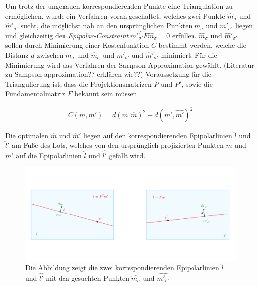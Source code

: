 Um trotz der ungenauen korrespondierenden Punkte eine Triangulation zu ermöglichen, wurde ein Verfahren voran geschaltet, welches zwei Punkte $\hat{m}_\sigma$ und $\hat{m}'_{\sigma'}$ sucht, die möglichst nah an den ursprünglichen Punkten $m_\sigma$ und $m'_{\sigma'}$ liegen und gleichzeitig den \textit{Epipolar-Constraint} $\hat{m}'^T_{\sigma'}F\hat{m}_\sigma = 0$ erfüllen. $\hat{m}_\sigma$ und $\hat{m}'_{\sigma'}$ sollen durch Minimierung einer Kostenfunktion $C$ bestimmt werden, welche die Distanz  $d$ zwischen $m_\sigma$ und $\hat{m}_\sigma$ und $m'_{\sigma'}$ und $\hat{m}'_{\sigma'}$ minimiert. Für die Minimierung wird das Verfahren der Sampson-Approximation gewählt\cite{HZ}. (Literatur zu Sampson approximation?? erklären wie??) Voraussetzung für die Triangulierung ist, dass die Projektionsmatrizen $P$ und $P'$, sowie die Fundamentalmatrix $F$ bekannt sein müssen\cite{HZ}.

\begin{gather}
	C(m,m') = d(m,\hat{m})^2 + d(m',\hat{m'})^2
\end{gather}


Die optimalen $\hat{m}$ und $\hat{m}'$ liegen auf den korrespondierenden Epipolarlinien $\hat{l}$ und $\hat{l}'$ am Fuße des Lots, welches von den ursprünglich projizierten Punkten $m$ und $m'$ auf die Epipolarlinien $\hat{l}$ und $\hat{l'}$ gefällt wird\cite{HZ}. 


\begin{figure}[!htb]
	\centering
	\includegraphics[width=.8\linewidth]{images/SampsAppxNewPoints.png}
	\caption[Sampson Approximation aufstellen der Kostenfunktion]{Die Abbildung zeigt die zwei korrespondierenden Epipolarlinien $\hat{l}$ und $\hat{l'}$ mit den gesuchten Punkten $\hat{m_\sigma}$ und $\hat{m'_{\sigma'}}$}
\end{figure}


